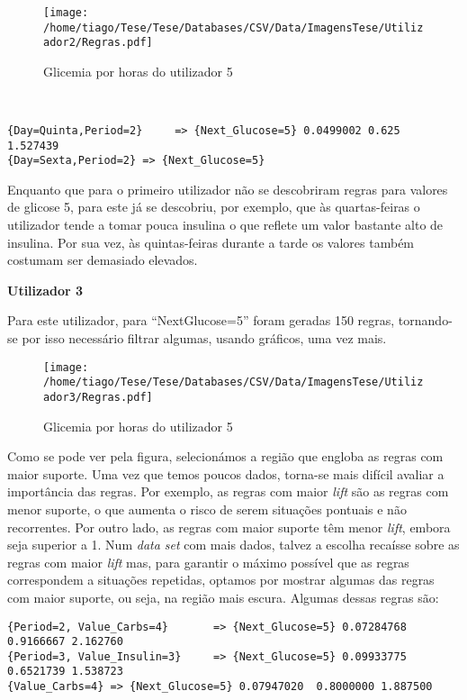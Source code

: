\begin{figure}[H]
\centering
\texttt{[image: /home/tiago/Tese/Tese/Databases/CSV/Data/ImagensTese/Utilizador2/Regras.pdf]}
\caption{Glicemia por horas do utilizador 5}
\end{figure}


\begin{lstlisting}


{Day=Quinta,Period=2}     => {Next_Glucose=5} 0.0499002 0.625      1.527439
{Day=Sexta,Period=2} => {Next_Glucose=5}

\end{lstlisting}

Enquanto que para o primeiro utilizador não se descobriram regras para valores de glicose 5, para este já se descobriu, por exemplo, que às quartas-feiras o utilizador tende a tomar pouca insulina o que reflete um valor bastante alto de insulina. Por sua vez, às quintas-feiras durante a tarde os valores também costumam ser demasiado elevados. 






\textbf{Utilizador 3}

Para este utilizador, para ``Next\textunderscore Glucose=5'' foram geradas 150 regras, tornando-se por isso necessário filtrar algumas, usando gráficos, uma vez mais. 


\begin{figure}[H]
\centering
\texttt{[image: /home/tiago/Tese/Tese/Databases/CSV/Data/ImagensTese/Utilizador3/Regras.pdf]}
\caption{Glicemia por horas do utilizador 5}
\end{figure}

Como se pode ver pela figura, selecionámos a região que engloba as regras com maior suporte. Uma vez que temos poucos dados, torna-se mais difícil avaliar a importância das regras. Por exemplo, as regras com maior \textit{lift} são as regras com menor suporte, o que aumenta o risco de serem situações pontuais e não recorrentes. Por outro lado, as regras com maior suporte têm menor \textit{lift}, embora seja superior a 1. Num \textit{data set} com mais dados, talvez a escolha recaísse sobre as regras com maior \textit{lift} mas, para garantir o máximo possível que as regras correspondem a situações repetidas, optamos por mostrar algumas das regras com maior suporte, ou seja, na região mais escura. Algumas dessas regras são:

\begin{lstlisting}
{Period=2, Value_Carbs=4}       => {Next_Glucose=5} 0.07284768  0.9166667 2.162760  
{Period=3, Value_Insulin=3}     => {Next_Glucose=5} 0.09933775  0.6521739 1.538723
{Value_Carbs=4} => {Next_Glucose=5} 0.07947020  0.8000000 1.887500
\end{lstlisting}

